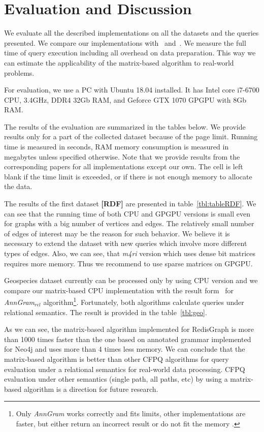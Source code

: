 \section{Evaluation and Discussion}

We evaluate all the described implementations on all the datasets and the queries presented.
We compare our implementations with~\cite{Mishin:2019:ECP:3327964.3328503} and~\cite{Kuijpers:2019:ESC:3335783.3335791}.
We measure the full time of query execution including all overhead on data preparation.
This way we can estimate the applicability of the matrix-based algorithm to real-world problems.

For evaluation, we use a PC with Ubuntu 18.04 installed.
It has Intel core i7-6700 CPU, 3.4GHz, DDR4 32Gb RAM, and Geforce GTX 1070 GPGPU with 8Gb RAM.

The results of the evaluation are summarized in the tables below.
We provide results only for a part of the collected dataset because of the page limit.
Running time is measured in seconds, RAM memory consumption is measured in megabytes unless specified otherwise.
Note that we provide results from the corresponding papers for all implementations except our own.
The cell is left blank if the time limit is exceeded, or if there is not enough memory to allocate the data.

The results of the first dataset \textbf{[RDF]} are presented in table~\ref{tbl:tableRDF}.
We can see that the running time of both CPU and GPGPU versions is small even for graphs with a big number of vertices and edges.
The relatively small number of edges of interest may be the reason for such behavior.
We believe it is necessary to extend the dataset with new queries which involve more different types of edges.
Also, we can see, that \textit{m4ri} version which uses dense bit matrices requires more memory.
Thus we recommend to use sparse matrices on GPGPU.

Geospecies dataset currently can be processed only by using CPU version and we compare our matrix-based CPU implementation with the result form~\cite{Kuijpers:2019:ESC:3335783.3335791} for \textit{AnnGram$_{\textit{rel}}$} algorithm\footnote{Only \textit{AnnGram} works correctly and fits limits, other implementations are faster, but either return an incorrect result or do not fit the memory .}.
Fortunately, both algorithms calculate queries under relational semantics.
The result is provided in the table~\ref{tbl:geo}.

As we can see, the matrix-based algorithm implemented for RedisGraph is more than 1000 times faster than the one based on annotated grammar implemented for Neo4j and uses more than 4 times less memory.
We can conclude that the matrix-based algorithm is better than other CFPQ algorithms for query evaluation under a relational semantics for real-world data processing.
CFPQ evaluation under other semantics (single path, all paths, etc) by using a matrix-based algorithm is a direction for future research.


